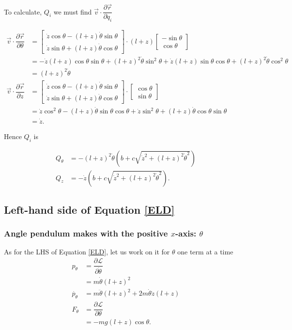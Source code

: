 \documentclass[12pt,a4paper,portrait]{article}
\newcommand{\lag}{\mathcal{L}}
\newcommand{\eq}[1]{Equation \eqref{#1}}
\begin{document}
To calculate, $Q_i$ we must find $\vec{v} \cdot \dfrac{\partial \vec{r}}{\partial q_i}$

\begin{align*}
	\vec{v} \cdot \dfrac{\partial \vec{r}}{\partial \theta} &= \begin{bmatrix}
		\dot{z}\cos{\theta} - (l+z)\dot{\theta}\sin{\theta} \\
		\dot{z}\sin{\theta} + (l+z)\dot{\theta}\cos{\theta}
	\end{bmatrix} \cdot (l+z)\begin{bmatrix}
		-\sin{\theta} \\
		\cos{\theta}
	\end{bmatrix} \\
	&= -\dot{z}(l+z)\cos{\theta} \sin{\theta} + (l+z)^2 \dot{\theta}\sin^2{\theta} + \dot{z}(l+z)\sin{\theta} \cos{\theta} +(l+z)^2\dot{\theta}\cos^2{\theta} \\
	&= (l+z)^2 \dot{\theta} \\
	\vec{v} \cdot \dfrac{\partial \vec{r}}{\partial z} &= \begin{bmatrix}
		\dot{z}\cos{\theta} - (l+z)\dot{\theta}\sin{\theta} \\
		\dot{z}\sin{\theta} + (l+z)\dot{\theta}\cos{\theta}
	\end{bmatrix} \cdot \begin{bmatrix}
		\cos{\theta} \\
		\sin{\theta}
	\end{bmatrix} \\
	&= \dot{z}\cos^2{\theta} - (l+z)\dot{\theta} \sin{\theta}\cos{\theta} + \dot{z}\sin^2{\theta} + (l+z)\dot{\theta}\cos{\theta}\sin{\theta} \\
	&= \dot{z}. 
\end{align*}

Hence $Q_i$ is

\begin{align*}
	Q_{\theta} &= -(l+z)^2 \dot{\theta} \left(b+c\sqrt{\dot{z}^2+(l+z)^2\dot{\theta}^2}\right) \\
	Q_z &= -\dot{z}\left(b+c\sqrt{\dot{z}^2+(l+z)^2\dot{\theta}^2}\right).
\end{align*}

\subsection{Left-hand side of \eq{ELD}}
\subsubsection{Angle pendulum makes with the positive $x$-axis: $\theta$}
As for the LHS of \eq{ELD}, let us work on it for $\theta$ one term at a time
\begin{align*}
	p_{\theta} &= \dfrac{\partial \lag}{\partial \dot{\theta}} \\
	&= m\dot{\theta}(l+z)^2 \\
	\dot{p_{\theta}} &= m\ddot{\theta} (l+z)^2 + 2m\dot{\theta}\dot{z}(l+z) \\
	F_{\theta} &= \dfrac{\partial \lag}{\partial \theta} \\
	&= -mg(l+z)\cos{\theta}.
\end{align*}
\end{document}
